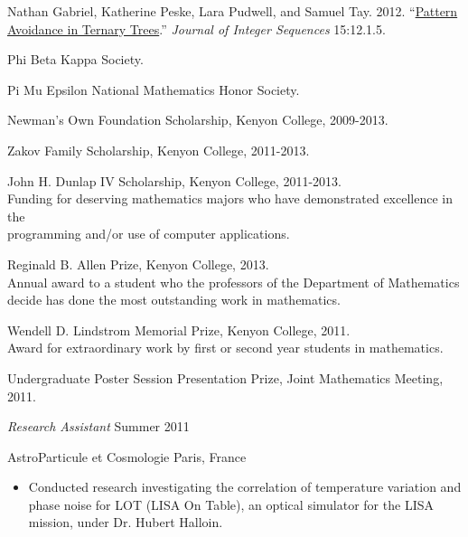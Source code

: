 \documentclass[11pt,article,oneside]{memoir}
\begin{document}
\bigskip



\ind Nathan Gabriel, Katherine Peske, Lara Pudwell, and Samuel Tay. 2012.
  ``\href{http://arxiv.org/abs/1110.2225}{Pattern Avoidance in Ternary Trees}.''
  \emph{Journal of Integer Sequences} 15:12.1.5. \vspace{0.05in}

\bigskip



\ind Phi Beta Kappa Society.

\ind Pi Mu Epsilon National Mathematics Honor Society.

\ind Newman's Own Foundation Scholarship, Kenyon College, 2009-2013.

\ind Zakov Family Scholarship, Kenyon College, 2011-2013.

\ind John H. Dunlap IV Scholarship, Kenyon College, 2011-2013. \\
\footnotesize
  Funding for deserving mathematics majors who have demonstrated excellence in
  the \\ programming and/or use of computer applications.
\normalsize

\ind Reginald B. Allen Prize, Kenyon College, 2013. \\
\footnotesize
  Annual award to a student who the professors of the Department of
  Mathematics decide has done the most outstanding work in mathematics.
\normalsize

\ind Wendell D. Lindstrom Memorial Prize, Kenyon College, 2011. \\
\footnotesize
  Award for extraordinary work by first or second year students in mathematics.
\normalsize

\ind Undergraduate Poster Session Presentation Prize, Joint Mathematics Meeting, 2011. \\

\bigskip



\ind \emph{Research Assistant} \hfill {\small Summer 2011}

\ind AstroParticule et Cosmologie \hfill {\small Paris, France}
\small
\begin{itemize}
  \item Conducted research investigating the correlation of temperature
    variation and phase noise for LOT (LISA On Table), an optical simulator for
    the LISA mission, under Dr. Hubert Halloin.
\end{itemize}
\normalsize
\end{document}
